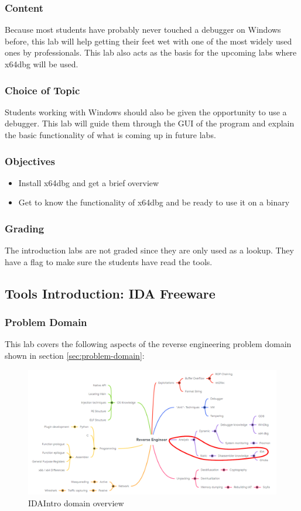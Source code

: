 \subsubsection*{Content}
Because most students have probably never touched a debugger on Windows before, this lab will help getting their feet wet with one of the most widely used ones by professionals.
This lab also acts as the basis for the upcoming labs where x64dbg will be used.
\subsubsection*{Choice of Topic}
Students working with Windows should also be given the opportunity to use a debugger. This lab will guide them through the GUI of the program and explain the basic functionality of what is coming up in future labs.
\subsubsection*{Objectives}
\begin{itemize}
    \item Install x64dbg and get a brief overview
    \item Get to know the functionality of x64dbg and be ready to use it on a binary
\end{itemize}
\subsubsection*{Grading}
The introduction labs are not graded since they are only used as a lookup. They have a flag to make sure the students have read the tools.
\pagebreak

\subsection{Tools Introduction: IDA Freeware}
\subsubsection*{Problem Domain}
This lab covers the following aspects of the reverse engineering problem domain shown in section \ref{sec:problem-domain}:
\vspace{-2ex}
\begin{figure}[H]
    \includegraphics[width=\textwidth]{resources/IDAIntro-overview-light.png}
    \caption{IDAIntro domain overview}
    \label{fig:IDAIntro-overview}
\end{figure}
